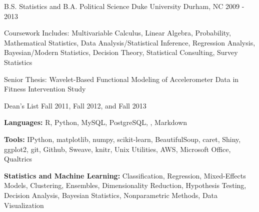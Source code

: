 \documentclass[11pt, a4paper]{awesome-cv}
\begin{document}
\makecvheader

\begin{cventries}
  \vspace{.5 mm}
  \cventry
    {B.S. Statistics and B.A. Political Science}
    {Duke University}
    {Durham, NC}
    {2009 - 2013}
    {
      \begin{cvitems}
        \item{Coursework Includes: Multivariable Calculus, Linear Algebra, Probability,
        Mathematical Statistics, Data Analysis/Statistical Inference, Regression Analysis, 
        Bayesian/Modern Statistics, Decision Theory, Statistical Consulting, Survey Statistics}
        \item{Senior Thesis: Wavelet-Based Functional Modeling of Accelerometer Data 
        in Fitness Intervention Study}
        \item{Dean’s List Fall 2011, Fall 2012, and Fall 2013}
      \end{cvitems}
    }
\end{cventries}

\begin{cventries}
  \cventry
    {}
    {}
    {}
    {}
    {
      \begin{cvitems}
        \item{\textbf{Languages:} R, Python, MySQL, PostgreSQL, , Markdown}
        \item{\textbf{Tools:} IPython, matplotlib, numpy, scikit-learn, BeautifulSoup, caret, Shiny, ggplot2, git, Github, Sweave, knitr,
        Unix Utilities, AWS, Microsoft Office, Qualtrics}
        \item{\textbf{Statistics and Machine Learning:} Classification, Regression, Mixed-Effects Models, Clustering, Ensembles,
        Dimensionality Reduction, Hypothesis Testing, Decision Analysis, Bayesian Statistics, Nonparametric Methods, Data Visualization}
      \end{cvitems}
    }
\end{cventries}
\end{document}
